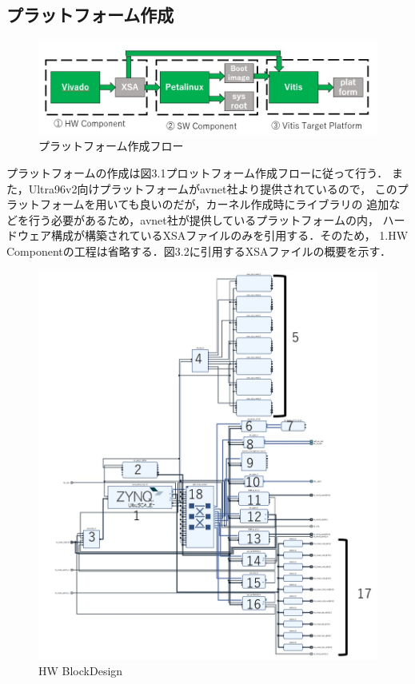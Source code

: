 \documentclass[11pt,a4j]{jreport}
\begin{document}
\subsection{プラットフォーム作成}
\begin{figure}[H]
  \center
  \includegraphics[scale = 0.8]{pict/pict.jpg}
  \caption{プラットフォーム作成フロー}
\end{figure}
プラットフォームの作成は図3.1プロットフォーム作成フローに従って行う．
また，Ultra96v2向けプラットフォームがavnet社より提供されているので，
このプラットフォームを用いても良いのだが，カーネル作成時にライブラリの
追加などを行う必要があるため，avnet社が提供しているプラットフォームの内，
ハードウェア構成が構築されているXSAファイルのみを引用する．そのため，
1.HW Componentの工程は省略する．図3.2に引用するXSAファイルの概要を示す．
\begin{figure}[H]
  \center
  \includegraphics[scale = 0.8]{pict/pict2.jpg}
  \caption{HW BlockDesign}
\end{figure}
\end{document}
